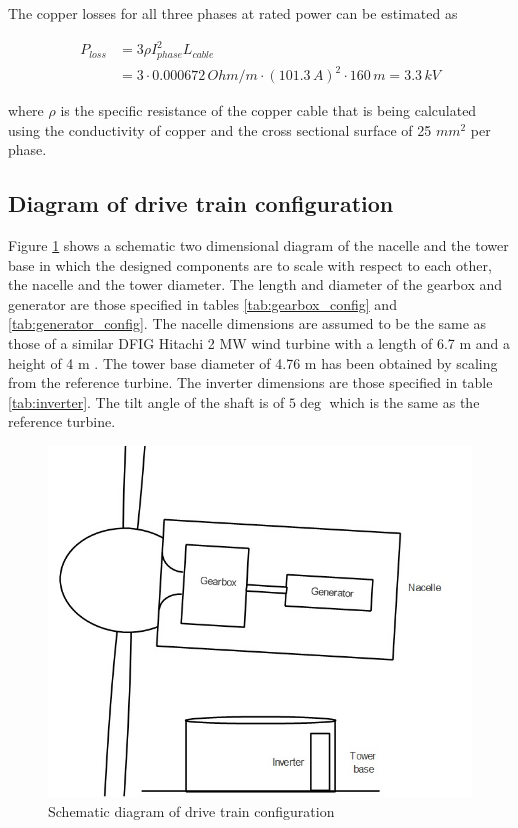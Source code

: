 The copper losses for all three phases at rated power can be estimated as

\begin{align}
    P_{loss} &= 3 \rho I_{phase}^2 L_{cable} \\
    &= 3 \cdot 0.000672\,Ohm/m \cdot \left(101.3\,A\right)^2 \cdot 160\,m = 3.3\,kV \nonumber
\end{align}

where $\rho$ is the specific resistance of the copper cable that is being calculated using the conductivity of copper and the cross sectional surface of 25 $mm^2$ per phase. 

\subsection{Diagram of drive train configuration}

Figure \ref{fig:eddie's art} shows a schematic two dimensional diagram of the nacelle and the tower base in which the designed components are to scale with respect to each other, the nacelle and the tower diameter. The length and diameter of the gearbox and generator are those specified in tables \ref{tab:gearbox_config} and \ref{tab:generator_config}. The nacelle dimensions are assumed to be the same as those of a similar DFIG Hitachi 2 MW wind turbine with a length of 6.7 m and a height of 4 m \cite{hitachi}. The tower base diameter of 4.76 m has been obtained by scaling from the reference turbine. The inverter dimensions are those specified in table \ref{tab:inverter}. The tilt angle of the shaft is of $5\deg$ which is the same as the reference turbine.


\begin{figure}[H]
    \centering
    \includegraphics[width=1\textwidth]{Images/Drive_train_sketch.jpg}
    \caption{Schematic diagram of drive train configuration}
    \label{fig:eddie's art}
\end{figure}


